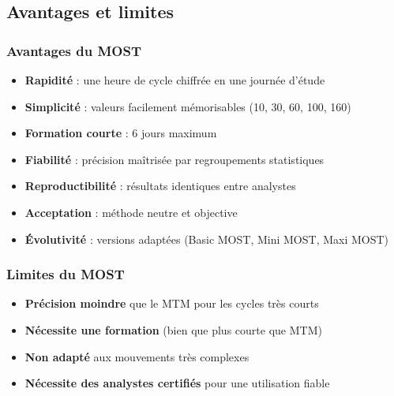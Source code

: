 \documentclass[a4paper,12pt]{article}
\begin{document}
\begin{center}
\end{center}

\subsection{Avantages et limites}

\subsubsection{Avantages du MOST}

\begin{itemize}
    \item \textbf{Rapidité} : une heure de cycle chiffrée en une journée d'étude
    \item \textbf{Simplicité} : valeurs facilement mémorisables (10, 30, 60, 100, 160)
    \item \textbf{Formation courte} : 6 jours maximum
    \item \textbf{Fiabilité} : précision maîtrisée par regroupements statistiques
    \item \textbf{Reproductibilité} : résultats identiques entre analystes
    \item \textbf{Acceptation} : méthode neutre et objective
    \item \textbf{Évolutivité} : versions adaptées (Basic MOST, Mini MOST, Maxi MOST)
\end{itemize}

\subsubsection{Limites du MOST}

\begin{itemize}
    \item \textbf{Précision moindre} que le MTM pour les cycles très courts
    \item \textbf{Nécessite une formation} (bien que plus courte que MTM)
    \item \textbf{Non adapté} aux mouvements très complexes
    \item \textbf{Nécessite des analystes certifiés} pour une utilisation fiable
\end{itemize}
\end{document}
